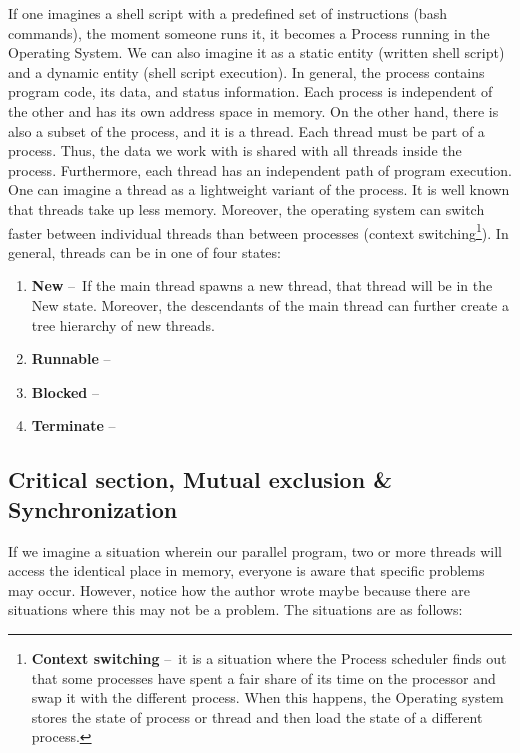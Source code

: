 If one imagines a shell script with a predefined set of instructions (bash commands), the moment someone runs it, it becomes a Process running in the Operating System. We can also imagine it as a static entity (written shell script) and a dynamic entity (shell script execution). In general, the process contains program code, its data, and status information. Each process is independent of the other and has its own address space in memory.
On the other hand, there is also a subset of the process, and it is a thread. Each thread must be part of a process. Thus, the data we work with is shared with all threads inside the process. Furthermore, each thread has an independent path of program execution. One can imagine a thread as a lightweight variant of the process. It is well known that threads take up less memory. Moreover, the operating system can switch faster between individual threads than between processes (context switching\footnote {\textbf{Context switching} \---\ it is a situation where the Process scheduler finds out that some processes have spent a fair share of its time on the processor and swap it with the different process. When this happens, the Operating system stores the state of process or thread and then load the state of a different process.}). In general, threads can be in one of four states:
\begin{enumerate}[itemsep=1mm, parsep=0pt]
	\item \textbf{New} \---\ If the main thread spawns a new thread, that thread will be in the New state. Moreover, the descendants of the main thread can further create a tree hierarchy of new threads.
        \item \textbf{Runnable} \---\ 
        \item \textbf{Blocked} \---\
         \item \textbf{Terminate} \---\
\end{enumerate}

\subsection{Critical section, Mutual exclusion \& Synchronization}

If we imagine a situation wherein our parallel program, two or more threads will access the identical place in memory, everyone is aware that specific problems may occur. However, notice how the author wrote maybe because there are situations where this may not be a problem. The situations are as follows:

